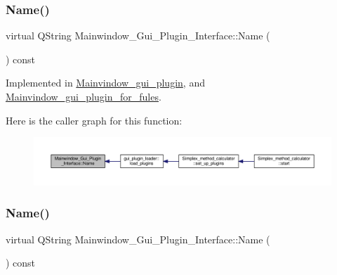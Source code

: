 \mbox{\label{classMainwindow__Gui__Plugin__Interface_a5cbc7bb0e3bb477472b91f65e916db8e}} 
\subsubsection{\texorpdfstring{Name()}{Name()}\hspace{0.1cm}{\footnotesize\ttfamily [2/3]}}
{\footnotesize\ttfamily virtual Q\+String Mainwindow\+\_\+\+Gui\+\_\+\+Plugin\+\_\+\+Interface\+::\+Name (\begin{DoxyParamCaption}{ }\end{DoxyParamCaption}) const\hspace{0.3cm}{\ttfamily [pure virtual]}}



Implemented in \hyperlink{classMainvindow__gui__plugin_affd8ce27d7e94a2adac287bc8dd835e0}{Mainvindow\+\_\+gui\+\_\+plugin}, and \hyperlink{classMainvindow__gui__plugin__for__fules_abfd45e12e05f78b189c4ad00f7fb6930}{Mainvindow\+\_\+gui\+\_\+plugin\+\_\+for\+\_\+fules}.

Here is the caller graph for this function\+:\nopagebreak
\begin{figure}[H]
\begin{center}
\leavevmode
\includegraphics[width=350pt]{classMainwindow__Gui__Plugin__Interface_a5cbc7bb0e3bb477472b91f65e916db8e_icgraph}
\end{center}
\end{figure}
\mbox{\label{classMainwindow__Gui__Plugin__Interface_a5cbc7bb0e3bb477472b91f65e916db8e}} 
\subsubsection{\texorpdfstring{Name()}{Name()}\hspace{0.1cm}{\footnotesize\ttfamily [3/3]}}
{\footnotesize\ttfamily virtual Q\+String Mainwindow\+\_\+\+Gui\+\_\+\+Plugin\+\_\+\+Interface\+::\+Name (\begin{DoxyParamCaption}{ }\end{DoxyParamCaption}) const\hspace{0.3cm}{\ttfamily [pure virtual]}}



